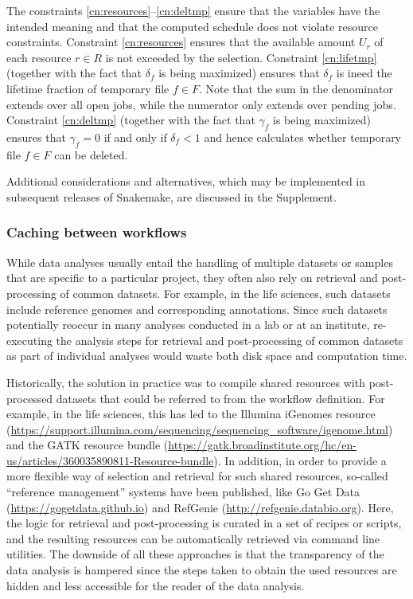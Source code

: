 \documentclass[parskip=half, DIV=18]{scrartcl}
\let\plainurl\url
\renewcommand{\url}[1]{\protect\plainurl{#1}}
\begin{document}
The constraints \eqref{cn:resources}--\eqref{cn:deltmp} ensure that the variables have the intended meaning and that the computed schedule does not violate resource constraints.
Constraint \eqref{cn:resources} ensures that the available amount $U_r$ of each resource $r \in R$ is not exceeded by the selection.
Constraint \eqref{cn:lifetmp} (together with the fact that $\delta_f$ is being maximized) ensures that $\delta_{f}$ is ineed the lifetime fraction of temporary file $f \in F$.
Note that the sum in the denominator extends over all open jobs, while the numerator only extends over pending jobs.
Constraint \eqref{cn:deltmp} (together with the fact that $\gamma_f$ is being maximized) ensures that $\gamma_f=0$ if and only if $\delta_f < 1$ and hence calculates whether temporary file $f \in F$ can be deleted.

Additional considerations and alternatives, which may be implemented in subsequent releases of Snakemake, are discussed in the Supplement.



\subsubsection{Caching between workflows}\label{sec:caching}

While data analyses usually entail the handling of multiple datasets or samples that are specific to a particular project, they often also rely on retrieval and post-processing of common datasets.
For example, in the life sciences, such datasets include reference genomes and corresponding annotations.
Since such datasets potentially reoccur in many analyses conducted in a lab or at an institute, re-executing the analysis steps for retrieval and post-processing of common datasets as part of individual analyses would waste both disk space and computation time.

Historically, the solution in practice was to compile shared resources with post-processed datasets that could be referred to from the workflow definition.
For example, in the life sciences, this has led to the Illumina iGenomes resource (\url{https://support.illumina.com/sequencing/sequencing\_software/igenome.html}) and the GATK resource bundle (\url{https://gatk.broadinstitute.org/hc/en-us/articles/360035890811-Resource-bundle}).
In addition, in order to provide a more flexible way of selection and retrieval for such shared resources, so-called ``reference management'' systems have been published, like Go Get Data (\url{https://gogetdata.github.io}) and RefGenie (\url{http://refgenie.databio.org}).
Here, the logic for retrieval and post-processing is curated in a set of recipes or scripts, and the resulting resources can be automatically retrieved via command line utilities.
The downside of all these approaches is that the transparency of the data analysis is hampered since the steps taken to obtain the used resources are hidden and less accessible for the reader of the data analysis.
\end{document}
